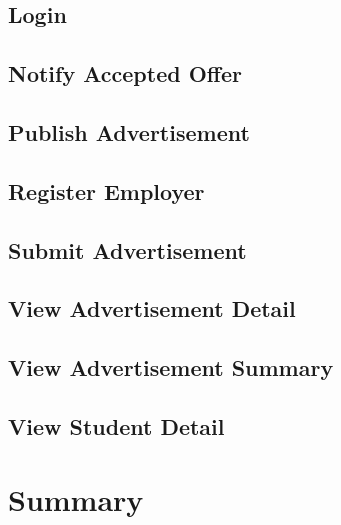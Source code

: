 \documentclass[11pt]{l3deliverable}
\begin{document}


\subsection{Login}



\newpage

\subsection{Notify Accepted Offer}



\newpage

\subsection{Publish Advertisement}



\subsection{Register Employer}



\subsection{Submit Advertisement}



\subsection{View Advertisement Detail}



\subsection{View Advertisement Summary}



\subsection{View Student Detail}



\newpage

\section{Summary}
\end{document}
